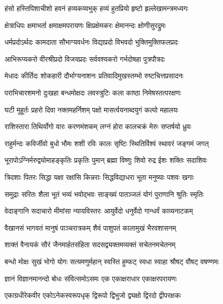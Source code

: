 \twolineshloka
{हंसो हस्तिपिशाचीशो हवनं हव्यकव्यभुक्}
{हव्यं हुतप्रियो हृष्टो हृल्लेखामन्त्रमध्यगः}%

\twolineshloka
{क्षेत्राधिपः क्षमाभर्ता क्षमाक्षमपरायणः}
{क्षिप्रक्षेमकरः क्षेमानन्दः क्षोणीसुरद्रुमः}%

\twolineshloka
{धर्मप्रदोऽर्थदः कामदाता सौभाग्यवर्धनः}
{विद्याप्रदो विभवदो भुक्तिमुक्तिफलप्रदः}%

\twolineshloka
{आभिरूप्यकरो वीरश्रीप्रदो विजयप्रदः}
{सर्ववश्यकरो गर्भदोषहा पुत्रपौत्रदः}%

\twolineshloka
{मेधादः कीर्तिदः शोकहारी दौर्भाग्यनाशनः}
{प्रतिवादिमुखस्तम्भो रुष्टचित्तप्रसादनः}%

\twolineshloka
{पराभिचारशमनो दुःखहा बन्धमोक्षदः}
{लवस्त्रुटिः कला काष्ठा निमेषस्तत्परक्षणः}%

\twolineshloka
{घटी मुहूर्तः प्रहरो दिवा नक्तमहर्निशम्}
{पक्षो मासर्त्वयनाब्दयुगं कल्पो महालयः}%

\twolineshloka
{राशिस्तारा तिथिर्योगो वारः करणमंशकम्}
{लग्नं होरा कालचक्रं मेरुः सप्तर्षयो ध्रुवः}%

\twolineshloka
{राहुर्मन्दः कविर्जीवो बुधो भौमः शशी रविः}
{कालः सृष्टिः स्थितिर्विश्वं स्थावरं जङ्गमं जगत्}%

\twolineshloka
{भूरापोऽग्निर्मरुद्व्योमाहङ्कृतिः प्रकृतिः पुमान्}
{ब्रह्मा विष्णुः शिवो रुद्र ईशः शक्तिः सदाशिवः}%

\twolineshloka
{त्रिदशाः पितरः सिद्धा यक्षा रक्षांसि किन्नराः}
{सिद्धविद्याधरा भूता मनुष्याः पशवः खगाः}%

\twolineshloka
{समुद्राः सरितः शैला भूतं भव्यं भवोद्भवः}
{साङ्ख्यं पातञ्जलं योगं पुराणानि श्रुतिः स्मृतिः}%

\twolineshloka
{वेदाङ्गानि सदाचारो मीमांसा न्यायविस्तरः}
{आयुर्वेदो धनुर्वेदो गान्धर्वं काव्यनाटकम्}%

\twolineshloka
{वैखानसं भागवतं मानुषं पाञ्चरात्रकम्}
{शैवं पाशुपतं कालामुखं भैरवशासनम्}%

\twolineshloka
{शाक्तं वैनायकं सौरं जैनमार्हतसंहिता}
{सदसद्व्यक्तमव्यक्तं सचेतनमचेतनम्}%

\twolineshloka
{बन्धो मोक्षः सुखं भोगो योगः सत्यमणुर्महान्}
{स्वस्ति हुम्फट् स्वधा स्वाहा श्रौषट् वौषट् वषण्णमः}%

\twolineshloka
{ज्ञानं विज्ञानमानन्दो बोधः संवित्समोऽसमः}
{एक एकाक्षराधार एकाक्षरपरायणः}%

\twolineshloka
{एकाग्रधीरेकवीर एकोऽनेकस्वरूपधृक्}
{द्विरूपो द्विभुजो द्व्यक्षो द्विरदो द्वीपरक्षकः}%

